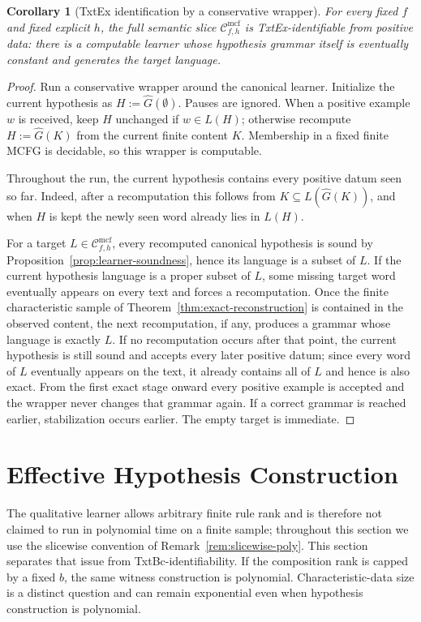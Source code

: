 \documentclass[11pt,a4paper]{article}
\numberwithin{equation}{section}
\theoremstyle{plain}
\newtheorem{corollary}[theorem]{Corollary}
\theoremstyle{definition}
\theoremstyle{remark}
\newcommand{\Cmcf}[2]{\mathcal{C}^{\mathrm{mcf}}_{#1,#2}}
\begin{document}
\begin{corollary}[TxtEx identification by a conservative wrapper]
\label{cor:gold-explanatory}
For every fixed \(f\) and fixed explicit \(h\), the full semantic slice
\(\Cmcf{f}{h}\) is TxtEx-identifiable from positive data: there is a
computable learner whose hypothesis grammar itself is eventually constant and
generates the target language.
\end{corollary}

\begin{proof}
Run a conservative wrapper around the canonical learner.  Initialize the
current hypothesis as \(H:=\widehat G(\emptyset)\).  Pauses are ignored.  When a positive example \(w\)
is received, keep \(H\) unchanged if \(w\in L(H)\); otherwise recompute
\(H:=\widehat G(K)\) from the current finite content \(K\).  Membership in a
fixed finite MCFG is decidable, so this wrapper is computable.

Throughout the run, the current hypothesis contains every positive datum seen so
far.  Indeed, after a recomputation this follows from
\(K\subseteq L(\widehat G(K))\), and when \(H\) is kept the newly seen word
already lies in \(L(H)\).

For a target \(L\in\Cmcf{f}{h}\), every recomputed canonical hypothesis is
sound by Proposition~\ref{prop:learner-soundness}, hence its language is a
subset of \(L\).  If the current hypothesis language is a proper subset of
\(L\), some missing target word eventually appears on every text and forces a
recomputation.  Once the finite characteristic sample of
Theorem~\ref{thm:exact-reconstruction} is contained in the observed content,
the next recomputation, if any, produces a grammar whose language is exactly
\(L\).  If no recomputation occurs after that point, the current hypothesis is
still sound and accepts every later positive datum; since every word of $L$
eventually appears on the text, it already contains all of $L$ and hence is
also exact.  From the first exact stage onward every positive example is
accepted and the wrapper never changes that grammar again.  If a correct
grammar is reached earlier, stabilization occurs earlier.  The empty target is
immediate.
\end{proof}


\section{Effective Hypothesis Construction}
\label{sec:poly-time}

The qualitative learner allows arbitrary finite rule rank and is therefore not
claimed to run in polynomial time on a finite sample; throughout this section
we use the slicewise convention of Remark~\ref{rem:slicewise-poly}.  This section separates
that issue from TxtBc-identifiability.  If the composition rank is capped by a fixed \(b\), the same witness
construction is polynomial.  Characteristic-data size is a distinct question
and can remain exponential even when hypothesis construction is polynomial.
\end{document}
